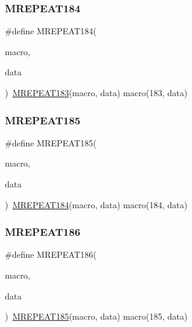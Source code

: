 \mbox{\label{group__group__sam0__utils__mrepeat_ga7b8a834a1fbd1d3dcfa95f0d3724835f}} 
\subsubsection{\texorpdfstring{MREPEAT184}{MREPEAT184}}
{\footnotesize\ttfamily \#define M\+R\+E\+P\+E\+A\+T184(\begin{DoxyParamCaption}\item[{}]{macro,  }\item[{}]{data }\end{DoxyParamCaption})~\mbox{\hyperlink{group__group__sam0__utils__mrepeat_ga413ea4db626945b91fb34b078615b02c}{M\+R\+E\+P\+E\+A\+T183}}(macro, data)   macro(183, data)}

\mbox{\label{group__group__sam0__utils__mrepeat_ga72fd4bb3bee8d7ae45897345c0ca13d1}} 
\subsubsection{\texorpdfstring{MREPEAT185}{MREPEAT185}}
{\footnotesize\ttfamily \#define M\+R\+E\+P\+E\+A\+T185(\begin{DoxyParamCaption}\item[{}]{macro,  }\item[{}]{data }\end{DoxyParamCaption})~\mbox{\hyperlink{group__group__sam0__utils__mrepeat_ga7b8a834a1fbd1d3dcfa95f0d3724835f}{M\+R\+E\+P\+E\+A\+T184}}(macro, data)   macro(184, data)}

\mbox{\label{group__group__sam0__utils__mrepeat_gaffac3b38c0b0a12816b6620ebd99d6a9}} 
\subsubsection{\texorpdfstring{MREPEAT186}{MREPEAT186}}
{\footnotesize\ttfamily \#define M\+R\+E\+P\+E\+A\+T186(\begin{DoxyParamCaption}\item[{}]{macro,  }\item[{}]{data }\end{DoxyParamCaption})~\mbox{\hyperlink{group__group__sam0__utils__mrepeat_ga72fd4bb3bee8d7ae45897345c0ca13d1}{M\+R\+E\+P\+E\+A\+T185}}(macro, data)   macro(185, data)}

